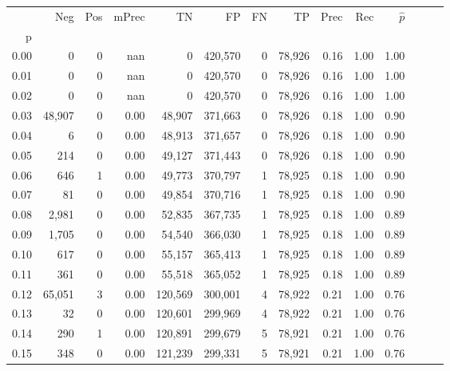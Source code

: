 \begin{tabular}{rrrrrrrrrrrrrr}
\toprule
{} &     Neg &     Pos & mPrec &       TN &       FP &      FN &      TP &  Prec &   Rec & $\hat{p}$ \\
p    &         &         &       &          &          &         &         &       &       &           \\
\midrule
0.00 &       0 &       0 &   nan &        0 &  420,570 &       0 &  78,926 &  0.16 &  1.00 &      1.00 \\
0.01 &       0 &       0 &   nan &        0 &  420,570 &       0 &  78,926 &  0.16 &  1.00 &      1.00 \\
0.02 &       0 &       0 &   nan &        0 &  420,570 &       0 &  78,926 &  0.16 &  1.00 &      1.00 \\
0.03 &  48,907 &       0 &  0.00 &   48,907 &  371,663 &       0 &  78,926 &  0.18 &  1.00 &      0.90 \\
0.04 &       6 &       0 &  0.00 &   48,913 &  371,657 &       0 &  78,926 &  0.18 &  1.00 &      0.90 \\
0.05 &     214 &       0 &  0.00 &   49,127 &  371,443 &       0 &  78,926 &  0.18 &  1.00 &      0.90 \\
0.06 &     646 &       1 &  0.00 &   49,773 &  370,797 &       1 &  78,925 &  0.18 &  1.00 &      0.90 \\
0.07 &      81 &       0 &  0.00 &   49,854 &  370,716 &       1 &  78,925 &  0.18 &  1.00 &      0.90 \\
0.08 &   2,981 &       0 &  0.00 &   52,835 &  367,735 &       1 &  78,925 &  0.18 &  1.00 &      0.89 \\
0.09 &   1,705 &       0 &  0.00 &   54,540 &  366,030 &       1 &  78,925 &  0.18 &  1.00 &      0.89 \\
0.10 &     617 &       0 &  0.00 &   55,157 &  365,413 &       1 &  78,925 &  0.18 &  1.00 &      0.89 \\
0.11 &     361 &       0 &  0.00 &   55,518 &  365,052 &       1 &  78,925 &  0.18 &  1.00 &      0.89 \\
0.12 &  65,051 &       3 &  0.00 &  120,569 &  300,001 &       4 &  78,922 &  0.21 &  1.00 &      0.76 \\
0.13 &      32 &       0 &  0.00 &  120,601 &  299,969 &       4 &  78,922 &  0.21 &  1.00 &      0.76 \\
0.14 &     290 &       1 &  0.00 &  120,891 &  299,679 &       5 &  78,921 &  0.21 &  1.00 &      0.76 \\
0.15 &     348 &       0 &  0.00 &  121,239 &  299,331 &       5 &  78,921 &  0.21 &  1.00 &      0.76 \\

\end{tabular}
